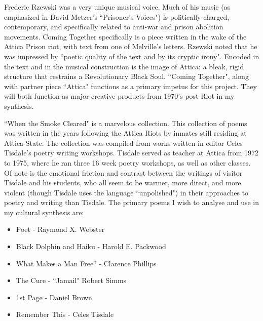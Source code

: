 \documentclass[12pt,letterpaper]{article}
\begin{document}
\clearpage


\begin{adjustwidth}{2.5ex}{0pt}

  Frederic Rzewski was a very unique musical voice. Much of his music 
  (as emphasized in David Metzer's ``Prisoner's Voices") is politically 
  charged, contemporary, and specifically related to anti-war and 
  prison abolition movements. Coming Together specifically is a piece 
  written in the wake of the Attica Prison riot, with text from one 
  of Melville's letters. Rzewski noted that he was impressed by 
  ``poetic quality of the text and by its cryptic irony". Encoded 
  in the text and in the musical construction is the image of Attica: 
  a bleak, rigid structure that restrains a Revolutionary Black Soul. 
  ``Coming Together", along with partner piece ``Attica" functions as 
  a primary impetus for this project. They will both function as major 
  creative products from 1970's post-Riot in my synthesis. 

\end{adjustwidth}

\clearpage


\begin{adjustwidth}{2.5ex}{0pt}

  ``When the Smoke Cleared" is a marvelous collection. This 
  collection of poems was written in the years following the 
  Attica Riots by inmates still residing at Attica State. The 
  collection was compiled from works written in editor Celes 
  Tisdale's poetry writing workshops. Tisdale served as teacher 
  at Attica from 1972 to 1975, where he ran three 16 week poetry 
  workshops, as well as other classes. Of note is the emotional 
  friction and contrast between the writings of visitor Tisdale 
  and his students, who all seem to be warmer, more direct, and 
  more violent (though Tisdale uses the language 	``unpolished") 
  in their approaches to poetry and writing than Tisdale. The 
  primary poems I wish to analyse and use in my cultural synthesis 
  are: 
  \begin{itemize}
  
    \item Poet - Raymond X. Webster
    
    \item Black Dolphin and Haiku - Harold E. Packwood  
    
    \item What Makes a Man Free? - Clarence Phillips
    
    \item The Cure - ``Jamail" Robert Simms
    
    \item 1st Page - Daniel Brown
    
    \item Remember This - Celes Tisdale
  
  \end{itemize}
  
\end{adjustwidth}
\end{document}
